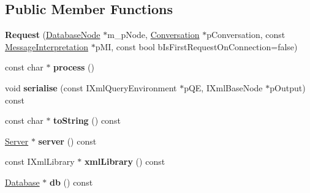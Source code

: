 \subsection*{\-Public \-Member \-Functions}
\begin{DoxyCompactItemize}
\item 
\hypertarget{classgeneral__server_1_1Request_a2e7633cd48fabc7ce5a16a56a8241922}{{\bfseries \-Request} (\hyperlink{classgeneral__server_1_1DatabaseNode}{\-Database\-Node} $\ast$m\-\_\-p\-Node, \hyperlink{classgeneral__server_1_1Conversation}{\-Conversation} $\ast$p\-Conversation, const \hyperlink{classgeneral__server_1_1MessageInterpretation}{\-Message\-Interpretation} $\ast$p\-M\-I, const bool b\-Is\-First\-Request\-On\-Connection=false)}\label{classgeneral__server_1_1Request_a2e7633cd48fabc7ce5a16a56a8241922}

\item 
\hypertarget{classgeneral__server_1_1Request_a68e0197ce5624f82b139ef957415986b}{const char $\ast$ {\bfseries process} ()}\label{classgeneral__server_1_1Request_a68e0197ce5624f82b139ef957415986b}

\item 
\hypertarget{classgeneral__server_1_1Request_ab4764b26c428d357969b51658ce51704}{void {\bfseries serialise} (const \-I\-Xml\-Query\-Environment $\ast$p\-Q\-E, \-I\-Xml\-Base\-Node $\ast$p\-Output) const }\label{classgeneral__server_1_1Request_ab4764b26c428d357969b51658ce51704}

\item 
\hypertarget{classgeneral__server_1_1Request_a531f41a2693e01a764d62b495062d55d}{const char $\ast$ {\bfseries to\-String} () const }\label{classgeneral__server_1_1Request_a531f41a2693e01a764d62b495062d55d}

\item 
\hypertarget{classgeneral__server_1_1Request_adeaa0ad35404efa0a7129a12046beac0}{\hyperlink{classgeneral__server_1_1Server}{\-Server} $\ast$ {\bfseries server} () const }\label{classgeneral__server_1_1Request_adeaa0ad35404efa0a7129a12046beac0}

\item 
\hypertarget{classgeneral__server_1_1Request_af53f73c90ea64f3f865d82bb0479dc6a}{const \-I\-Xml\-Library $\ast$ {\bfseries xml\-Library} () const }\label{classgeneral__server_1_1Request_af53f73c90ea64f3f865d82bb0479dc6a}

\item 
\hypertarget{classgeneral__server_1_1Request_a4e3529a5bfccc38095cf75f31a75a12e}{\hyperlink{classgeneral__server_1_1Database}{\-Database} $\ast$ {\bfseries db} () const }\label{classgeneral__server_1_1Request_a4e3529a5bfccc38095cf75f31a75a12e}


\end{DoxyCompactItemize}
